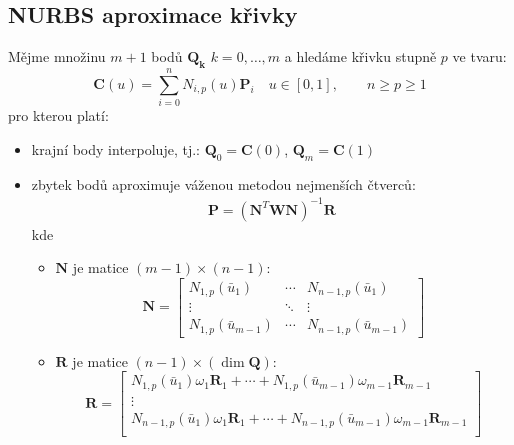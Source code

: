 \subsection{NURBS aproximace křivky\label{sec:NURBS aproximace křivky}}
Mějme množinu $m + 1$ bodů $\bm{Q_k}$ ${k = 0, \ldots, m}$ a hledáme
křivku stupně $p$ ve tvaru:
\begin{equation}
    \bm{C}(u) = \sum_{i = 0}^{n}N_{i,p}(u)\bm{P}_i\quad u\in[0,1], \quad\quad n \ge p \ge 1
\end{equation}
pro kterou platí:
\begin{itemize}
    \item krajní body interpoluje, tj.: $\bm{Q}_0 = \bm{C}(0)$, $\bm{Q}_m = \bm{C}(1)$
    \item zbytek bodů aproximuje váženou metodou nejmenších čtverců:
          \begin{align}
              \bm{P} = (\bm{N}^T \bm{W} \bm{N})^{-1}\bm{R}
          \end{align}
          kde
          \begin{itemize}
              \item $\bm{N}$ je matice $(m - 1) \times (n - 1)$:
                    \begin{equation}
                        \bm{N} = \begin{bmatrix}
                            N_{1,p}(\bar{u}_1)        & \cdots & N_{n-1,p}(\bar{u}_1)     \\
                            \vdots                    & \ddots & \vdots                   \\
                            N_{1, p}(\bar{u}_{m - 1}) & \cdots & N_{n-1,p}(\bar{u}_{m-1})
                        \end{bmatrix}
                    \end{equation}
              \item $\bm{R}$ je matice $(n - 1)\times(\dim\bm{Q})$:
                    \begin{equation}
                        \bm{R} =
                        \begin{bmatrix}
                            N_{1,p}(\bar{u}_1)\omega_1\bm{R}_1 + \cdots + N_{1, p}(\bar{u}_{m - 1})\omega_{m-1}\bm{R}_{m - 1}     \\
                            \vdots                                                                                                \\
                            N_{n-1,p}(\bar{u}_1)\omega_1\bm{R}_1 + \cdots + N_{n-1, p}(\bar{u}_{m - 1})\omega_{m-1}\bm{R}_{m - 1} \\

\end{bmatrix}
\end{equation}
\end{itemize}
\end{itemize}
